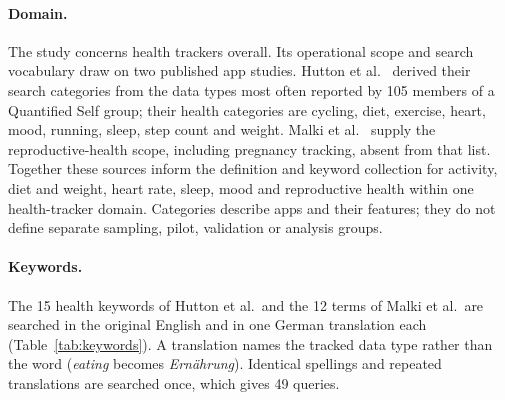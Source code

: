 \paragraph{Domain.} The study concerns health trackers overall. Its operational
scope and search vocabulary draw on two published app studies. Hutton et
al.~\parencite{hutton2018assessing} derived their search categories from the
data types most often reported by 105 members of a Quantified Self group;
their health categories are cycling, diet, exercise, heart, mood, running,
sleep, step count and weight. Malki et
al.~\parencite{malki2024exploring} supply the reproductive-health scope,
including pregnancy tracking, absent from that list. Together these sources
inform the definition and keyword collection for activity, diet and weight,
heart rate, sleep, mood and reproductive health within one health-tracker
domain. Categories describe apps and their features; they do not define
separate sampling, pilot, validation or analysis groups.

\paragraph{Keywords.} The 15 health keywords of Hutton et al.\ and the 12
terms of Malki et al.\ are searched in the original English and in one German
translation each (Table~\ref{tab:keywords}). A translation names the tracked
data type rather than the word (\emph{eating} becomes \emph{Ernährung}).
Identical spellings and repeated translations are searched once, which gives
49 queries.

